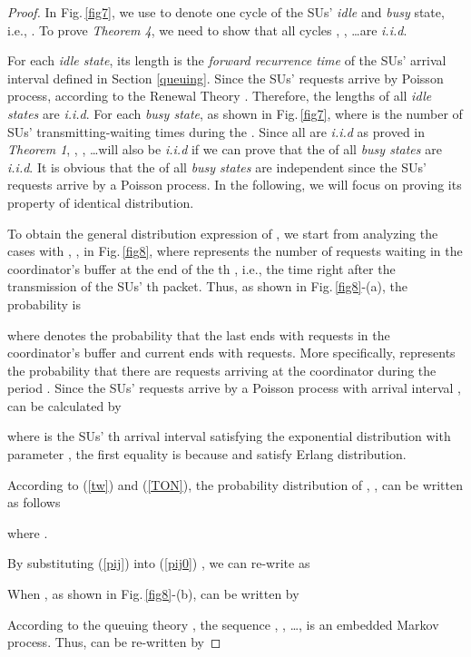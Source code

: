 \documentclass[11pt,draftcls]{IEEEtran}{\onecolumn}
\begin{document}
\begin{proof}
In Fig.\,\ref{fig7}, we use  to denote one cycle of the SUs'
\emph{idle} and \emph{busy} state, i.e., . To prove
\emph{Theorem 4}, we need to show that all cycles ,
, \dots are \emph{i.i.d}.

For each \emph{idle state}, its length  is the
\emph{forward recurrence time} of the SUs' arrival interval 
defined in Section \ref{queuing}. Since the SUs' requests arrive by
Poisson process, 
according to the Renewal Theory \cite{renew}. Therefore, the lengths
of all \emph{idle states} are \emph{i.i.d}. For each \emph{busy
state},  as shown in
Fig.\,\ref{fig7}, where  is the number of SUs'
transmitting-waiting times during the . Since all
 are \emph{i.i.d} as proved in \emph{Theorem 1}, ,
, \dots will also be \emph{i.i.d} if we can prove that the
 of all \emph{busy states} are \emph{i.i.d}. It is obvious that
the  of all \emph{busy states} are independent since the SUs'
requests arrive by a Poisson process. In the following, we will
focus on proving its property of identical distribution.

To obtain the general distribution expression of , we start from
analyzing the cases with , ,  in
Fig.\,\ref{fig8}, where  represents the number of requests
waiting in the coordinator's buffer at the end of the th ,
i.e., the time right after the transmission of the SUs' th
packet. Thus, as shown in Fig.\,\ref{fig8}-(a), the probability
 is

where  denotes the probability that the last  ends with
 requests in the coordinator's buffer and current  ends with
 requests. More specifically,  represents the probability
that there are  requests arriving at the coordinator during
the period . Since the SUs' requests arrive by a Poisson
process with arrival interval ,  can be calculated by

where  is the SUs' th arrival interval satisfying the
exponential distribution with parameter , the first
equality is because  and
 satisfy Erlang distribution.

According to (\ref{tw}) and (\ref{TON}), the probability
distribution of , , can be written as follows

where .

By substituting (\ref{pij}) into (\ref{pij0}) , we can re-write
 as


When , as shown in Fig.\,\ref{fig8}-(b),  can be
written by

According to the queuing theory \cite{queuing}, the sequence ,
, \dots,  is an embedded Markov process. Thus, 
can be re-written by



\end{proof}
\end{document}
